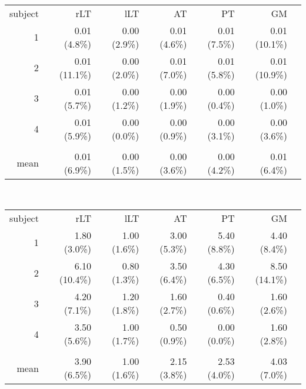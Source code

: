 \begin{table}
\begin{adjustbox}{width={0.8\textwidth},keepaspectratio}
\begin{minipage}{\linewidth}
{\begin{minipage}{\linewidth}
\begin{tabular}{rrrrrrr}
            \bottomrule
            \end{tabular}%
			\\[0.5ex]
            \begin{tabular}{rrrrrrr}
            \addlinespace
			\multicolumn{6}{c}{\textbf{P0$_{z}$}}\\
			\toprule
            subject & rLT   & lLT   & AT    & PT    & GM   \\
            \midrule
            1     & 0.01 (4.8\%) & 0.00 (2.9\%) & 0.01 (4.6\%) & 0.01 (7.5\%) & 0.01 (10.1\%)\\
            2     & 0.01 (11.1\%) & 0.00 (2.0\%) & 0.01 (7.0\%) & 0.01 (5.8\%) & 0.01 (10.9\%) \\
            3     & 0.01 (5.7\%) & 0.00 (1.2\%) & 0.00 (1.9\%) & 0.00 (0.4\%) & 0.00 (1.0\%)  \\
            4     & 0.01 (5.9\%) & 0.00 (0.0\%) & 0.00 (0.9\%) & 0.00 (3.1\%) & 0.00 (3.6\%) \\
                  &       &       &       &       &       \\
            mean  & 0.01 (6.9\%) & 0.00 (1.5\%) & 0.00 (3.6\%) & 0.00 (4.2\%) & 0.01 (6.4\%)  \\
            \bottomrule
            \end{tabular}%
			\\[0.5ex]
            \begin{tabular}{rrrrrrr}
	        \addlinespace
			\multicolumn{6}{c}{\textbf{FWHM$_{z}$}}\\			
	        \toprule
            subject & rLT   & lLT   & AT    & PT    & GM  \\
            \midrule
            1     & 1.80 (3.0\%) & 1.00 (1.6\%) & 3.00 (5.3\%) & 5.40 (8.8\%) & 4.40 (8.4\%) \\
            2     & 6.10 (10.4\%) & 0.80 (1.3\%) & 3.50 (6.4\%) & 4.30 (6.5\%) & 8.50 (14.1\%) \\
            3     & 4.20 (7.1\%) & 1.20 (1.8\%) & 1.60 (2.7\%) & 0.40 (0.6\%) & 1.60 (2.6\%) \\
            4     & 3.50 (5.6\%) & 1.00 (1.7\%) & 0.50 (0.9\%) & 0.00 (0.0\%) & 1.60 (2.8\%) \\
                  &       &       &       &       &   & \\
            mean  & 3.90 (6.5\%) & 1.00 (1.6\%) & 2.15 (3.8\%) & 2.53 (4.0\%) & 4.03 (7.0\%) \\
            \bottomrule
            \end{tabular}%
			\end{minipage}
			\label{tab:chapter6 scan rescan qsi}
        }
		\end{minipage}
		\end{adjustbox}	
\label{tab:chapter6 scan rescan}
\end{table}
